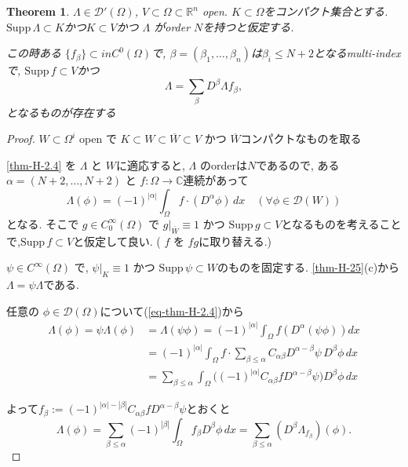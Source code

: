 \documentclass[dvipdfmx,a4paper,11pt]{article} %
\newtheorem{thm}{Theorem}[section]
\theoremstyle{definition}
\theoremstyle{remark}
\numberwithin{equation}{section}
\begin{document}

\begin{tcolorbox}[mybox]
\begin{thm}\cite[Theorem 6.27 ]{Rud}
\label{thm-H-2.5}
 \(\Lambda \in \mathcal{D}'(\Omega)\),  \(V \subset \Omega \subset \mathbb{R}^n\) open.
  \(K \subset \Omega\)をコンパクト集合とする. 
\(\mathrm{Supp}\,\Lambda \subset K\)かつ\(K \subset V\)かつ \(\Lambda\) がorder \(N\)を持つと仮定する.

この時ある \( \{f_\beta\} \subset in C^{0}(\Omega)\)で,  \(\beta = (\beta_1, \ldots, \beta_n)\)は\(\beta_i \leq N+2\)となるmulti-indexで,  
 \(\mathrm{Supp}\,f \subset V\)かつ
\[
\Lambda = \sum_\beta D^\beta \Lambda f_\beta,
\]
となるものが存在する
\end{thm}
\end{tcolorbox}
\begin{proof}
 \(W \subset \Omega^i\) open で
  \(K \subset W \subset \overline{W} \subset V\) かつ \(\overline{W}\)コンパクトなものを取る

\ref{thm-H-2.4} を \(\Lambda\) と \(W\)に適応すると, 
\(\Lambda\) のorderは\(N\)であるので,  
ある\( \alpha = (N+2,\ldots,N+2)\) と \(f: \Omega \to \mathbb{C}\)連続があって
\begin{equation}
\label{eq-thm-H-2.4}
\Lambda(\phi) = (-1)^{|\alpha|}
 \int_\Omega f \cdot (D^\alpha \phi) \, dx \quad (\forall \phi \in \mathcal{D}(W))
\end{equation}
となる. 
そこで \(g \in C_0^\infty(\Omega)\) で \(g|_{\overline{W}} \equiv 1\) かつ \(\mathrm{Supp}\,g \subset V\)となるものを考えることで,\(\mathrm{Supp}\,f \subset V\)と仮定して良い.  
( \(f\) を \(fg\)に取り替える.)

\(\psi \in C^\infty(\Omega)\) で, \(\psi|_K \equiv 1\) かつ \(\mathrm{Supp}\,\psi \subset W\)のものを固定する. 
\ref{thm-H-25}(c)から\(\Lambda = \psi \Lambda\)である. 


任意の \(\phi \in \mathcal{D}(\Omega)\)について(\ref{eq-thm-H-2.4})から
\begin{align*}
\Lambda(\phi) = \psi \Lambda(\phi) 
&= \Lambda(\psi \phi) = (-1)^{|\alpha|} \int_\Omega f (D^\alpha (\psi \phi)) dx \\
&= (-1)^{|\alpha|} \int_\Omega f \cdot \sum_{\beta \leq \alpha} C_{\alpha \beta} D^{\alpha - \beta} \psi \, D^\beta \phi \, dx \\
&= \sum_{\beta \leq \alpha} \int_\Omega \big( (-1)^{|\alpha|} C_{\alpha \beta} f D^{\alpha - \beta} \psi \big) D^\beta \phi \, dx
\end{align*}

よって\( f_\beta := (-1)^{|\alpha| - |\beta|} C_{\alpha \beta} f D^{\alpha - \beta} \psi \)とおくと
\[
\Lambda(\phi) = \sum_{\beta \leq \alpha} (-1)^{|\beta|} \int_\Omega f_\beta D^\beta \phi \, dx 
= \sum_{\beta \leq \alpha} (D^\beta \Lambda_{f_\beta})(\phi). 
\]
\end{proof}
\end{document}

